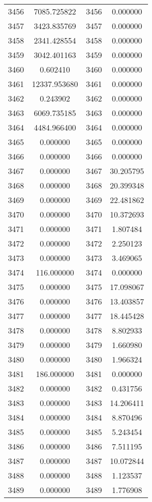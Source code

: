 \documentclass[12pt]{article}
\begin{document}
\begin{longtable}{@{}cccc@{}}
3456 & 7085.725822 & 3456 & 0.000000 \\
3457 & 3423.835769 & 3457 & 0.000000 \\
3458 & 2341.428554 & 3458 & 0.000000 \\
3459 & 3042.401163 & 3459 & 0.000000 \\
3460 & 0.602410 & 3460 & 0.000000 \\
3461 & 12337.953680 & 3461 & 0.000000 \\
3462 & 0.243902 & 3462 & 0.000000 \\
3463 & 6069.735185 & 3463 & 0.000000 \\
3464 & 4484.966400 & 3464 & 0.000000 \\
3465 & 0.000000 & 3465 & 0.000000 \\
3466 & 0.000000 & 3466 & 0.000000 \\
3467 & 0.000000 & 3467 & 30.205795 \\
3468 & 0.000000 & 3468 & 20.399348 \\
3469 & 0.000000 & 3469 & 22.481862 \\
3470 & 0.000000 & 3470 & 10.372693 \\
3471 & 0.000000 & 3471 & 1.807484 \\
3472 & 0.000000 & 3472 & 2.250123 \\
3473 & 0.000000 & 3473 & 3.469065 \\
3474 & 116.000000 & 3474 & 0.000000 \\
3475 & 0.000000 & 3475 & 17.098067 \\
3476 & 0.000000 & 3476 & 13.403857 \\
3477 & 0.000000 & 3477 & 18.445428 \\
3478 & 0.000000 & 3478 & 8.802933 \\
3479 & 0.000000 & 3479 & 1.660980 \\
3480 & 0.000000 & 3480 & 1.966324 \\
3481 & 186.000000 & 3481 & 0.000000 \\
3482 & 0.000000 & 3482 & 0.431756 \\
3483 & 0.000000 & 3483 & 14.206411 \\
3484 & 0.000000 & 3484 & 8.870496 \\
3485 & 0.000000 & 3485 & 5.243454 \\
3486 & 0.000000 & 3486 & 7.511195 \\
3487 & 0.000000 & 3487 & 10.072844 \\
3488 & 0.000000 & 3488 & 1.123537 \\
3489 & 0.000000 & 3489 & 1.776908 \\

\end{longtable}
\end{document}

